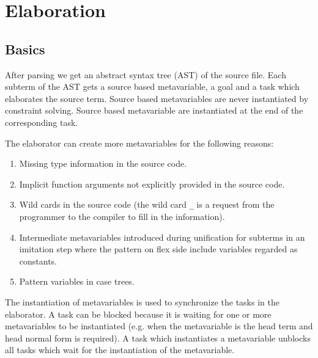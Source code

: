 \section{Elaboration}







\subsection{Basics}

After parsing we get an abstract syntax tree (AST) of the source file. Each
subterm of the AST gets a source based metavariable, a goal and a task which
elaborates the source term. Source based metavariables are never instantiated by
constraint solving. Source based metavariable are instantiated at the end of the
corresponding task.

The elaborator can create more metavariables for the following reasons:

\begin{enumerate}
    \item Missing type information in the source code.

    \item Implicit function arguments not explicitly provided in the source code.

    \item Wild cards in the source code (the wild card {\tt \_} is a request
        from the programmer to the compiler to fill in the information).

    \item Intermediate metavariables introduced during unification for subterms
        in an imitation step where the pattern on flex side include variables
        regarded as constants.

    \item Pattern variables in case trees.
\end{enumerate}

The instantiation of metavariables is used to synchronize the tasks in the
elaborator. A task can be blocked because it is waiting for one or more
metavariables to be instantiated (e.g. when the metavariable is the head term
and head normal form is required). A task which instantiates a metavariable
unblocks all tasks which wait for the instantiation of the metavariable.

